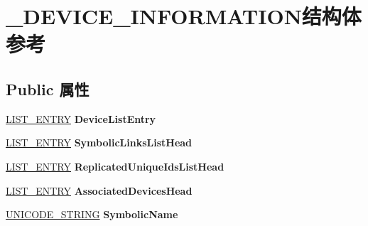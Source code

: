 \hypertarget{struct___d_e_v_i_c_e___i_n_f_o_r_m_a_t_i_o_n}{}\section{\+\_\+\+D\+E\+V\+I\+C\+E\+\_\+\+I\+N\+F\+O\+R\+M\+A\+T\+I\+O\+N结构体 参考}
\label{struct___d_e_v_i_c_e___i_n_f_o_r_m_a_t_i_o_n}
\subsection*{Public 属性}
\begin{DoxyCompactItemize}
\item 
\mbox{\label{struct___d_e_v_i_c_e___i_n_f_o_r_m_a_t_i_o_n_add445484dd8297fb6bbf4e98ef685d11}} 
\hyperlink{struct___l_i_s_t___e_n_t_r_y}{L\+I\+S\+T\+\_\+\+E\+N\+T\+RY} {\bfseries Device\+List\+Entry}
\item 
\mbox{\label{struct___d_e_v_i_c_e___i_n_f_o_r_m_a_t_i_o_n_adb4620ee88e926362fea2b0650252eef}} 
\hyperlink{struct___l_i_s_t___e_n_t_r_y}{L\+I\+S\+T\+\_\+\+E\+N\+T\+RY} {\bfseries Symbolic\+Links\+List\+Head}
\item 
\mbox{\label{struct___d_e_v_i_c_e___i_n_f_o_r_m_a_t_i_o_n_acc31838bc8f6b89467b10515204a471c}} 
\hyperlink{struct___l_i_s_t___e_n_t_r_y}{L\+I\+S\+T\+\_\+\+E\+N\+T\+RY} {\bfseries Replicated\+Unique\+Ids\+List\+Head}
\item 
\mbox{\label{struct___d_e_v_i_c_e___i_n_f_o_r_m_a_t_i_o_n_ad5fde72eb1706206cd82ba4e48f40800}} 
\hyperlink{struct___l_i_s_t___e_n_t_r_y}{L\+I\+S\+T\+\_\+\+E\+N\+T\+RY} {\bfseries Associated\+Devices\+Head}
\item 
\mbox{\label{struct___d_e_v_i_c_e___i_n_f_o_r_m_a_t_i_o_n_a47ab8d284074a150f8b6e454fd6f1c2c}} 
\hyperlink{struct___u_n_i_c_o_d_e___s_t_r_i_n_g}{U\+N\+I\+C\+O\+D\+E\+\_\+\+S\+T\+R\+I\+NG} {\bfseries Symbolic\+Name}
\item 
\mbox{\label{struct___d_e_v_i_c_e___i_n_f_o_r_m_a_t_i_o_n_a89c0421d5a61bc6c25a1473c1346e387}} 

\end{DoxyCompactItemize}
